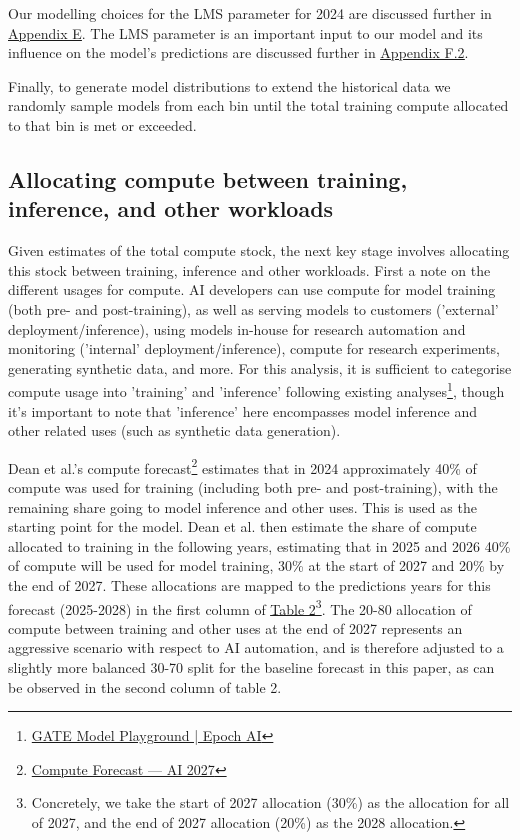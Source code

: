 \documentclass[11pt]{article}
\begin{document}
Our modelling choices for the LMS parameter for 2024 are discussed further in \underline{\hyperref[appendix-e-2024-predictions-under-uniform-sampling-of-lms]{Appendix E}}. The LMS parameter is an important input to our model and its influence on the model's predictions are discussed further in \underline{\hyperref[f.2-influence-of-lms-on-projections]{Appendix F.2}}.

Finally, to generate model distributions to extend the historical data we randomly sample models from each bin until the total training compute allocated to that bin is met or exceeded.

\subsection{Allocating compute between training, inference, and other workloads}
\label{allocating-compute-between-training-inference-and-other-workloads}

Given estimates of the total compute stock, the next key stage involves allocating this stock between training, inference and other workloads. First a note on the different usages for compute. AI developers can use compute for model training (both pre- and post-training), as well as serving models to customers ('external' deployment/inference), using models in-house for research automation and monitoring ('internal' deployment/inference), compute for research experiments, generating synthetic data, and more. For this analysis, it is sufficient to categorise compute usage into 'training' and 'inference' following existing analyses\footnote{\href{https://epoch.ai/gate}{GATE Model Playground | Epoch AI}}, though it's important to note that 'inference' here encompasses model inference and other related uses (such as synthetic data generation).

Dean et al.'s compute forecast\footnote{\href{https://ai-2027.com/research/compute-forecast}{Compute Forecast --- AI 2027}} estimates that in 2024 approximately 40\% of compute was used for training (including both pre- and post-training), with the remaining share going to model inference and other uses. This is used as the starting point for the model. Dean et al. then estimate the share of compute allocated to training in the following years, estimating that in 2025 and 2026 40\% of compute will be used for model training, 30\% at the start of 2027 and 20\% by the end of 2027. These allocations are mapped to the predictions years for this forecast (2025-2028) in the first column of \underline{\hyperref[table-2---compute-allocations-for-training-models-for-2025-2028.]{Table 2}}\footnote{Concretely, we take the start of 2027 allocation (30\%) as the allocation for all of 2027, and the end of 2027 allocation (20\%) as the 2028 allocation.}. The 20-80 allocation of compute between training and other uses at the end of 2027 represents an aggressive scenario with respect to AI automation, and is therefore adjusted to a slightly more balanced 30-70 split for the baseline forecast in this paper, as can be observed in the second column of table 2.
\end{document}
